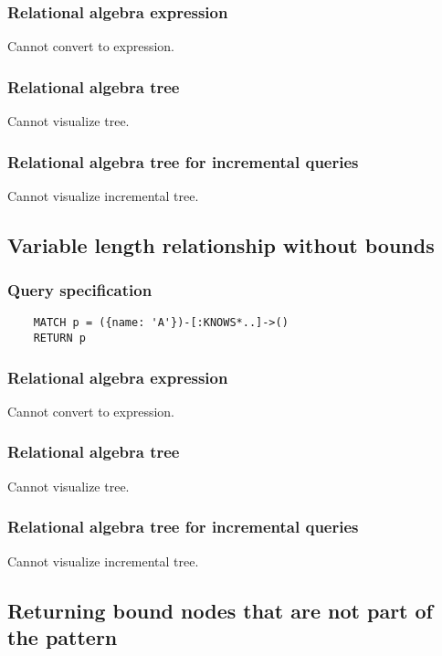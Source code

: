 	\subsubsection*{Relational algebra expression}

	Cannot convert to expression.

	\subsubsection*{Relational algebra tree}

	Cannot visualize tree.

	\subsubsection*{Relational algebra tree for incremental queries}

	Cannot visualize incremental tree.
	\subsection{Variable length relationship without bounds}

	\subsubsection*{Query specification}

	\begin{lstlisting}
	MATCH p = ({name: 'A'})-[:KNOWS*..]->()
	RETURN p
	\end{lstlisting}


	\subsubsection*{Relational algebra expression}

	Cannot convert to expression.

	\subsubsection*{Relational algebra tree}

	Cannot visualize tree.

	\subsubsection*{Relational algebra tree for incremental queries}

	Cannot visualize incremental tree.
	\subsection{Returning bound nodes that are not part of the pattern}

